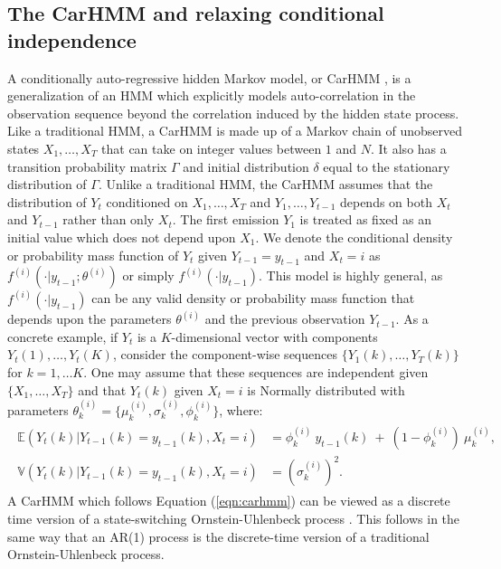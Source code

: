 \subsection{The CarHMM and relaxing conditional independence}

A conditionally auto-regressive hidden Markov model, or CarHMM \citep{Lawler:2019}, is a generalization of an HMM which explicitly models auto-correlation in the observation sequence beyond the correlation induced by the hidden state process. Like a traditional HMM, a CarHMM is made up of a Markov chain of unobserved states $X_1,\ldots,X_T$ that can take on integer values between $1$ and $N$. It also has a transition probability matrix $\Gamma$ and initial distribution $\delta$ equal to the stationary distribution of $\Gamma$. Unlike a traditional HMM, the CarHMM assumes that the distribution of $Y_t$ conditioned on $X_1,\ldots, X_T$ and $Y_1,\ldots, Y_{t-1}$ depends on both $X_t$ and $Y_{t-1}$ rather than only $X_t$. The first emission $Y_1$ is treated as fixed as an initial value which does not depend upon $X_1$. We denote the conditional density or probability mass function of $Y_t$ given $Y_{t-1} = y_{t-1}$ and $X_t=i$ as $f^{(i)}(\cdot | y_{t-1}; \theta^{(i)})$ or simply $f^{(i)}(\cdot | y_{t-1})$. This model is highly general, as $f^{(i)}(\cdot | y_{t-1})$ can be any valid density or probability mass function that depends upon the parameters $\theta^{(i)}$ and the previous observation $Y_{t-1}$. 
As a concrete example, if $Y_t$ is a $K$-dimensional vector with components $Y_t(1),\ldots,Y_t(K)$, consider the component-wise sequences $\{Y_1(k), \ldots, Y_T(k)\}$ for $k = 1,\ldots K$. One may assume that these sequences are independent given $\{X_1,\ldots,X_T\}$ and that $Y_t(k)$ given $X_t = i$ is Normally distributed with parameters $\theta^{(i)}_k = \{\mu^{(i)}_k,\sigma^{(i)}_k,\phi^{(i)}_k\}$, where:
%
\begin{align}
\label{eqn:carhmm}
\begin{split}
\mathbb{E}(Y_{t}(k)|Y_{t-1}(k) = y_{t-1}(k),X_t=i) &= \phi^{(i)}_k ~ y_{t-1}(k) ~+ ~(1-\phi^{(i)}_k)  ~\mu^{(i)}_k, \\
\mathbb{V}(Y_t(k)| Y_{t-1}(k) = y_{t-1}(k), X_t = i) &= (\sigma^{(i)}_k)^2.
\end{split}
\end{align}
%
A CarHMM which follows Equation (\ref{eqn:carhmm}) can be viewed as a discrete time version of a state-switching Ornstein-Uhlenbeck process \citep{Michelot:2019}. This follows in the same way that an AR(1) process is the discrete-time version of a traditional Ornstein-Uhlenbeck process. 

